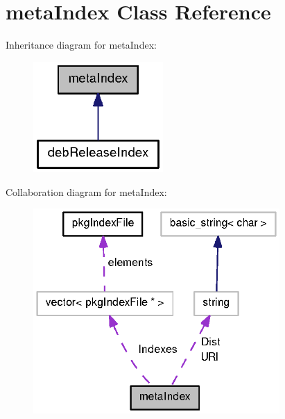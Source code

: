 \section{meta\-Index \-Class \-Reference}
\label{classmetaIndex}


\-Inheritance diagram for meta\-Index\-:
\nopagebreak
\begin{figure}[H]
\begin{center}
\leavevmode
\includegraphics[width=140pt]{classmetaIndex__inherit__graph}
\end{center}
\end{figure}


\-Collaboration diagram for meta\-Index\-:
\nopagebreak
\begin{figure}[H]
\begin{center}
\leavevmode
\includegraphics[width=266pt]{classmetaIndex__coll__graph}
\end{center}
\end{figure}
